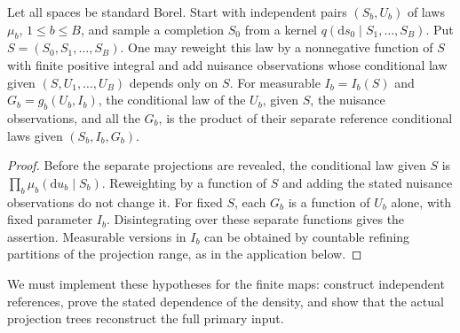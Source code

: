 \begin{lemma}\label{kern:conditional-blocks}
Let all spaces be standard Borel. Start with independent pairs $(S_b,U_b)$
of laws $\mu_b$, $1\le b\le B$, and sample a completion $S_0$ from a kernel
$q(\mathrm ds_0\mid S_1,\ldots,S_B)$. Put $S=(S_0,S_1,\ldots,S_B)$.
One may reweight this law by a nonnegative function of $S$ with finite positive
integral and add nuisance observations whose conditional law given $(S,U_1,\ldots,U_B)$
depends only on $S$. For measurable $I_b=I_b(S)$ and
$G_b=g_b(U_b,I_b)$, the conditional law of the $U_b$, given $S$, the nuisance
observations, and all the $G_b$, is the product of their separate reference
conditional laws given $(S_b,I_b,G_b)$.
\end{lemma}
\begin{proof}
Before the separate projections are revealed, the conditional law given $S$
is $\prod_b\mu_b(\mathrm du_b\mid S_b)$. Reweighting by a function of $S$
and adding the stated nuisance observations do not change it. For fixed $S$,
each $G_b$ is a function of $U_b$ alone, with fixed parameter $I_b$.
Disintegrating over these separate functions gives the assertion. Measurable
versions in $I_b$ can be obtained by countable refining partitions of the
projection range, as in the application below.
\end{proof}

We must implement these hypotheses for the finite maps: construct independent
references, prove the stated dependence of the density, and show that the
actual projection trees reconstruct the full primary input.


